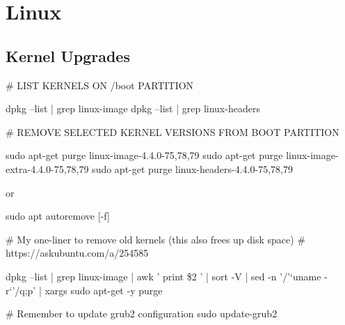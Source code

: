 \chapter{Linux}

\section{Kernel Upgrades}

\begin{txt}
    # LIST KERNELS ON /boot PARTITION
    
    dpkg --list | grep linux-image
    dpkg --list | grep linux-headers
\end{txt}

\begin{txt}    
    # REMOVE SELECTED KERNEL VERSIONS FROM BOOT PARTITION
    
    sudo apt-get purge linux-image-4.4.0-{75,78,79}
    sudo apt-get purge linux-image-extra-4.4.0-{75,78,79}
    sudo apt-get purge linux-headers-4.4.0-{75,78,79}
    
    or
    
    sudo apt autoremove [-f]
\end{txt}
    
\begin{txt}
    # My one-liner to remove old kernels (this also frees up disk space)
    # https://askubuntu.com/a/254585
    
    dpkg --list | grep linux-image | awk '{ print \$2 }' | sort -V | sed -n '/'`uname -r`'/q;p' | xargs sudo apt-get -y purge
\end{txt}
    
\begin{txt}    
    # Remember to update grub2 configuration
    sudo update-grub2
\end{txt}